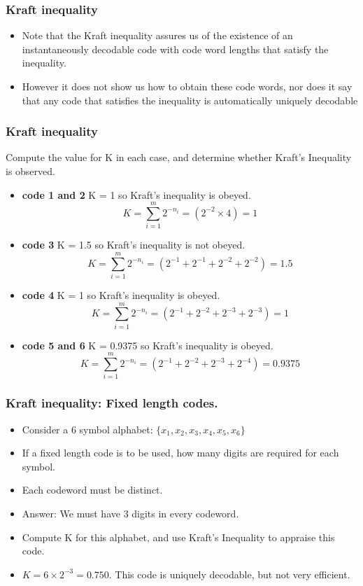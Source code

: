 \documentclass[a4]{beamer}
\begin{document}
\begin{frame}
\frametitle{Kraft inequality}
\begin{itemize}
\item Note that the Kraft inequality assures us of the existence of an instantaneously decodable code
with code word lengths that satisfy the inequality. \item However it does not show us how to obtain these code
words, nor does it say that any code that satisfies the inequality is automatically uniquely decodable
\end{itemize}
\end{frame}




\begin{frame}
\frametitle{Kraft inequality}
Compute the value for K in each case, and determine whether Kraft's Inequality is observed.
\begin{itemize}
\item \textbf{code 1 and 2} K = 1 so Kraft's inequality is obeyed.  \[ K = \sum^{m}_{i=1}2^{-n_i} = (2^{-2} \times 4) = 1 \]
\item \textbf{code 3} K = 1.5 so Kraft's inequality is not obeyed.   \[ K = \sum^{m}_{i=1}2^{-n_i} = (2^{-1} + 2^{-1} + 2^{-2} + 2^{-2}) = 1.5 \]
\item \textbf{code 4 } K = 1 so Kraft's inequality is obeyed.   \[ K = \sum^{m}_{i=1}2^{-n_i} = (2^{-1} + 2^{-2} + 2^{-3} + 2^{-3}) = 1 \]

\item \textbf{code 5 and 6 } K =  0.9375 so Kraft's inequality is obeyed.   \[ K = \sum^{m}_{i=1}2^{-n_i} = (2^{-1} + 2^{-2} + 2^{-3} + 2^{-4}) =  0.9375 \]
\end{itemize}
\end{frame}

\begin{frame}
\frametitle{Kraft inequality: Fixed length codes.}
\begin{itemize}
\item Consider a 6 symbol alphabet: $\{x_1, x_2, x_3, x_4, x_5,x_6\}$
\item If a fixed length code is to be used, how many digits are required for each symbol.
\item Each codeword must be distinct.
\item Answer: We must have 3 digits in every codeword.
\item Compute K for this alphabet, and use Kraft's Inequality to appraise this code.
\item $K = 6 \times 2^{-3} = 0.750$. This code is uniquely decodable, but not very efficient.
\end{itemize}
\end{frame}
\end{document}

